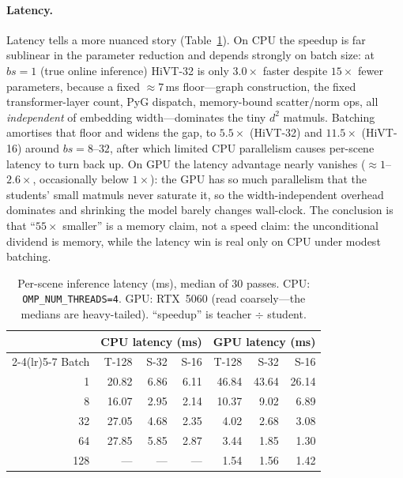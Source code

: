 \paragraph{Latency.}
Latency tells a more nuanced story (Table~\ref{tab:latency}). On CPU the speedup is
far sublinear in the parameter reduction and depends strongly on batch size: at
$bs{=}1$ (true online inference) HiVT-32 is only $3.0\times$ faster despite $15\times$
fewer parameters, because a fixed $\approx 7$\,ms floor---graph construction, the
fixed transformer-layer count, PyG dispatch, memory-bound scatter/norm ops, all
\emph{independent} of embedding width---dominates the tiny $d^2$ matmuls. Batching
amortises that floor and widens the gap, to $5.5\times$ (HiVT-32) and $11.5\times$
(HiVT-16) around $bs{=}8$--$32$, after which limited CPU parallelism causes
per-scene latency to turn back up. On GPU the latency advantage nearly
vanishes ($\approx 1$--$2.6\times$, occasionally below $1\times$): the GPU has so
much parallelism that the students' small matmuls never saturate it, so the
width-independent overhead dominates and shrinking the model barely changes
wall-clock. The conclusion is that ``$55\times$ smaller'' is a memory claim, not a
speed claim: the unconditional dividend is memory, while the latency win is real
only on CPU under modest batching.

\begin{table}[htbp]
  \centering
  \caption{Per-scene inference latency (ms), median of $30$ passes. CPU:
    \texttt{OMP\_NUM\_THREADS=4}. GPU: RTX~5060 (read coarsely---the medians are
    heavy-tailed). ``speedup'' is teacher $\div$ student.}
  \label{tab:latency}
  \begin{tabular}{rrrrrrr}
    \toprule
    & \multicolumn{3}{c}{CPU latency (ms)} & \multicolumn{3}{c}{GPU latency (ms)} \\
    \cmidrule(lr){2-4}\cmidrule(lr){5-7}
    Batch & T-128 & S-32 & S-16 & T-128 & S-32 & S-16 \\
    \midrule
    1   & 20.82 & 6.86 & 6.11 & 46.84 & 43.64 & 26.14 \\
    8   & 16.07 & 2.95 & 2.14 & 10.37 & 9.02  & 6.89 \\
    32  & 27.05 & 4.68 & 2.35 & 4.02  & 2.68  & 3.08 \\
    64  & 27.85 & 5.85 & 2.87 & 3.44  & 1.85  & 1.30 \\
    128 & ---   & ---  & ---  & 1.54  & 1.56  & 1.42 \\
    \bottomrule
  \end{tabular}
\end{table}

